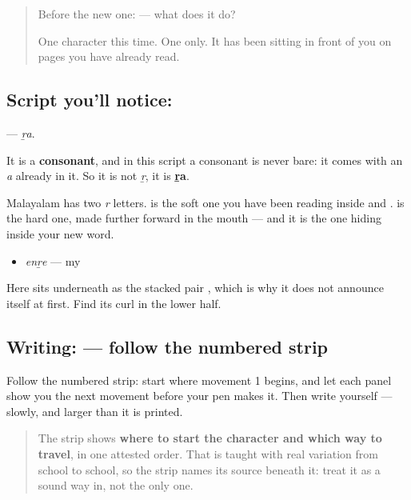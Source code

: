 \label{lesson:ML-S136-letter-rra}



\begin{quote}
Before the new one:  — what does it do?

One character this time. One only. It has been sitting in front of you on pages you have already read.
\end{quote}

\subsection*{Script you'll notice: }
\textbf{} — \emph{ṟa}.

It is a \textbf{consonant}, and in this script a consonant is never bare: it comes with an \emph{a} already in it. So it is not \emph{ṟ}, it is \textbf{ṟa}.

Malayalam has two \emph{r} letters. \textbf{} is the soft one you have been reading inside \textbf{} and \textbf{}. \textbf{} is the hard one, made further forward in the mouth — and it is the one hiding inside your new word.

\begin{itemize}
\raggedright
  \item \textbf{} \emph{enṟe} — my
\end{itemize}

Here \textbf{} sits underneath \textbf{} as the stacked pair \textbf{}, which is why it does not announce itself at first. Find its curl in the lower half.

\subsection*{Writing:  — follow the numbered strip}

Follow the numbered strip: start where movement 1 begins, and let each panel show you the next movement before your pen makes it. Then write  yourself — slowly, and larger than it is printed.

\begin{quote}
The strip shows \textbf{where to start the character and which way to travel}, in one attested order. That is taught with real variation from school to school, so the strip names its source beneath it: treat it as a sound way in, not the only one.
\end{quote}

